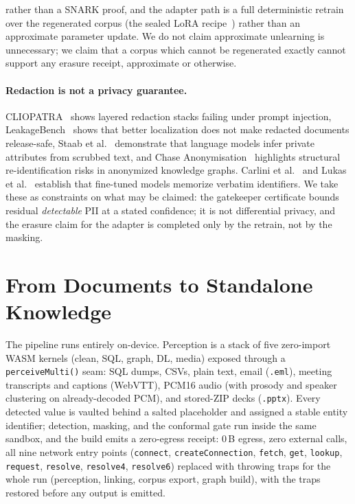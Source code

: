 \documentclass{article}
\begin{document}
rather than a SNARK proof, and the adapter path is a full deterministic retrain over the regenerated corpus (the sealed LoRA recipe~\cite{hu_lora}) rather than an approximate parameter update. We do not claim approximate unlearning is unnecessary; we claim that a corpus which cannot be regenerated exactly cannot support any erasure receipt, approximate or otherwise.

\paragraph{Redaction is not a privacy guarantee.}
CLIOPATRA~\cite{annamalai2026cliopatra} shows layered redaction stacks failing under prompt injection, LeakageBench~\cite{kumar2026leakagebench} shows that better localization does not make redacted documents release-safe, Staab et al.~\cite{staab2024beyond} demonstrate that language models infer private attributes from scrubbed text, and Chase Anonymisation~\cite{chase2024anonymisation} highlights structural re-identification risks in anonymized knowledge graphs. Carlini et al.~\cite{carlini_secret_sharer} and Lukas et al.~\cite{lukas_pii_leakage} establish that fine-tuned models memorize verbatim identifiers. We take these as constraints on what may be claimed: the gatekeeper certificate bounds residual \emph{detectable} PII at a stated confidence; it is not differential privacy, and the erasure claim for the adapter is completed only by the retrain, not by the masking.

\section{From Documents to Standalone Knowledge}
\label{sec:pipeline}

The pipeline runs entirely on-device. Perception is a stack of five zero-import WASM kernels (clean, SQL, graph, DL, media) exposed through a \texttt{perceiveMulti()} seam: SQL dumps, CSVs, plain text, email (\texttt{.eml}), meeting transcripts and captions (WebVTT), PCM16 audio (with prosody and speaker clustering on already-decoded PCM), and stored-ZIP decks (\texttt{.pptx}). Every detected value is vaulted behind a salted placeholder and assigned a stable entity identifier; detection, masking, and the conformal gate run inside the same sandbox, and the build emits a zero-egress receipt: $0$\,B egress, zero external calls, all nine network entry points (\texttt{connect}, \texttt{createConnection}, \texttt{fetch}, \texttt{get}, \texttt{lookup}, \texttt{request}, \texttt{resolve}, \texttt{resolve4}, \texttt{resolve6}) replaced with throwing traps for the whole run (perception, linking, corpus export, graph build), with the traps restored before any output is emitted.
\end{document}

